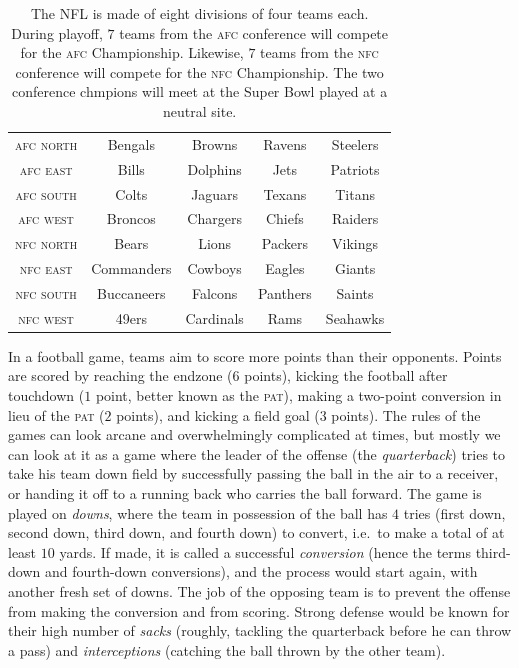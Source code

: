 \documentclass[10pt]{article}
\begin{document}
\begin{table}[htbp]
\centering
\begin{tabular}{|c|c|c|c|c|}
\hline
\textsc{afc north} & Bengals & Browns & Ravens & Steelers \\
\textsc{afc east} & Bills & Dolphins & Jets & Patriots \\
\textsc{afc south} & Colts & Jaguars & Texans & Titans \\
\textsc{afc west} & Broncos & Chargers & Chiefs & Raiders \\ \hline
\textsc{nfc north} & Bears & Lions & Packers & Vikings \\
\textsc{nfc east} & Commanders & Cowboys & Eagles & Giants \\
\textsc{nfc south} & Buccaneers & Falcons & Panthers & Saints \\
\textsc{nfc west} & 49ers & Cardinals & Rams & Seahawks \\ \hline
\end{tabular}
\caption{The NFL is made of eight divisions of four teams each. During playoff,
$7$ teams from the \textsc{afc} conference will compete for the \textsc{afc}
Championship. Likewise, $7$ teams from the \textsc{nfc} conference will compete for the
\textsc{nfc} Championship. The two conference chmpions will meet at the Super Bowl played
at a neutral site.}
\label{table:afc-nfc}
\end{table}

In a football game, teams aim to score more points than their opponents. Points are scored
by reaching the endzone ($6$ points), kicking the football after touchdown ($1$ point,
better known as the \textsc{pat}), making a two-point conversion in lieu of the \textsc{pat}
($2$ points), and kicking a field goal ($3$ points). The rules of the games can look arcane
and overwhelmingly complicated at times, but mostly we can look at it as a game where the
leader of the offense (the {\em quarterback}) tries to take his team down field by successfully
passing the ball in the air to a receiver, or handing it off to a running back who carries the
ball forward. The game is played on {\em downs}, where the team in possession of the
ball has $4$ tries (first 
down, second down, third down, and fourth down) to convert,
i.e.~to make a total of at least $10$ yards.
If made, it is called a successful {\em conversion}
 (hence the terms third-down and fourth-down conversions),
and the process would start again, with another fresh set of downs. The job of the 
opposing team is
to prevent the offense from making the conversion and from scoring. Strong defense would be
known for their high number of {\em sacks} (roughly, tackling the quarterback before he can
throw a pass) and {\em interceptions} (catching the ball thrown by
the other team).
\end{document}
